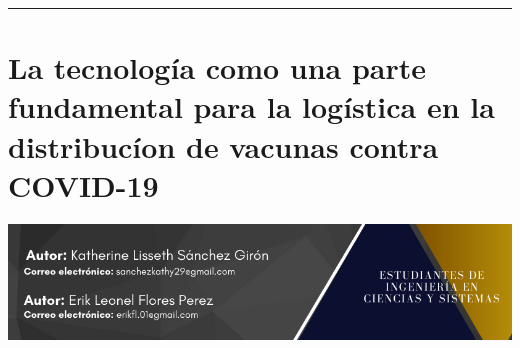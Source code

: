 \documentclass[12pt,spanish,Letterpaper,openany]{book}
\newcommand{\HRule}{\begin{center}\rule{0.5\linewidth}{0.2mm}\end{center}}
\begin{document}
\medskip

\HRule

\medskip

\hypertarget{pareja52}{%
\chapter{La tecnología como una parte fundamental para la logística en la distribucíon de vacunas contra COVID-19}\label{pareja52}}

\begin{center}\includegraphics[width=1\linewidth]{images/pareja52_02} \end{center}
\end{document}
